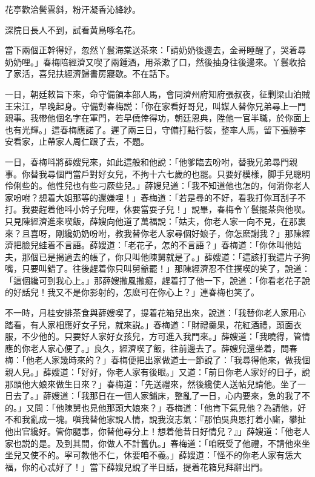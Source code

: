 \begin{myquote}
花亭歡洽鬢雲斜，粉汗凝香沁絳紗。

深院日長人不到，試看黄鳥啄名花。
\end{myquote}

當下兩個正幹得好，忽然丫鬟海棠送茶來：「請奶奶後邊去，金哥睡醒了，哭着尋奶奶哩。」春梅陪經濟又喫了兩鍾酒，用茶漱了口，然後抽身往後邊來。丫鬟收拾了家活，喜兒扶經濟歸書房寢歇。不在話下。

一日，朝廷敕旨下來，命守備領本部人馬，會同濟州府知府張叔夜，征剿梁山泊賊王宋江，早晚起身。守備對春梅説：「你在家看好哥兒，叫媒人替你兄弟尋上一門親事。我帶他個名字在軍門，若早僥倖得功，朝廷恩典，陞他一官半職，於你面上也有光輝。」這春梅應諾了。遲了兩三日，守備打點行裝，整率人馬，留下張勝李安看家，止帶家人周仁跟了去，不題。

一日，春梅呌將薛嫂兒來，如此這般和他說：「他爹臨去吩咐，替我兄弟尋門親事。你替我尋個門當戶對好女兒，不拘十六七歲的也罷。只要好模樣，脚手兒聰明伶俐些的。他性兒也有些刁厥些兒。」薛嫂兒道：「我不知道他也怎的，何消你老人家吩咐？想着大姐那等的還嫌哩！」春梅道：「若是尋的不好，看我打你耳刮子不打。我要趕着他呌小妗子兒哩，休要當耍子兒！」說畢，春梅令丫鬟擺茶與他喫。只見陳經濟進來喫飯，薛嫂向他道了萬福說：「姑夫，你老人家一向不見，在那裏來？且喜呀，剛纔奶奶吩咐，教我替你老人家尋個好娘子，你怎麽謝我？」那陳經濟把臉兒蛙着不言語。薛嫂道：「老花子，怎的不言語？」春梅道：「你休叫他姑夫，那個已是揭過去的帳了，你只叫他陳舅就是了。」薛嫂道：「這該打我這片子狗嘴，只要叫錯了。往後趕着你只叫舅爺罷！」那陳經濟忍不住撲喫的笑了，說道：「這個纔可到我心上。」那薛嫂撒風撒癡，趕着打了他一下，說道：「你看老花子說的好話兒！我又不是你影射的，怎麽可在你心上？」連春梅也笑了。

不一時，月桂安排茶食與薛嫂喫了，提着花箱兒出來，說道：「我替你老人家用心踏看，有人家相應好女子兒，就來説。」春梅道：「財禮羹果，花紅酒禮，頭面衣服，不少他的。只要好人家好女孩兒，方可進入我門來。」薛嫂道：「我曉得，管情應的你老人家心便了。」良久，經濟喫了飯，往前邊去了。薛嫂兒還坐着，問春梅：「他老人家幾時來的？」春梅便把出家做道士一節說了：「我尋得他來，做我個親人兒。」薛嫂道：「好好，你老人家有後眼。」又道：「前日你老人家好的日子，說那頭他大娘來做生日來？」春梅道：「先送禮來，然後纔使人送帖兒請他。坐了一日去了。」薛嫂道：「我那日在一個人家鋪床，整亂了一日，心内要來，急的我了不的。」又問：「他陳舅也見他那頭大娘來？」春梅道：「他肯下氣見他？為請他，好不和我亂成一塊。嗔我替他家說人情，說我沒志氣：『那怕吳典恩打着小廝，攀扯他出官纔好。管你腿事，你替他尋分上！想着他昔日好情兒？』」薛嫂道：「他老人家也説的是。及到其間，你做人不計舊仇。」春梅道：「咱旣受了他禮，不請他來坐坐兒又使不的。寜可教他不仁，休要咱不義。」薛嫂道：「怪不的你老人家有恁大福，你的心忒好了！」當下薛嫂兒說了半日話，提着花箱兒拜辭出門。

